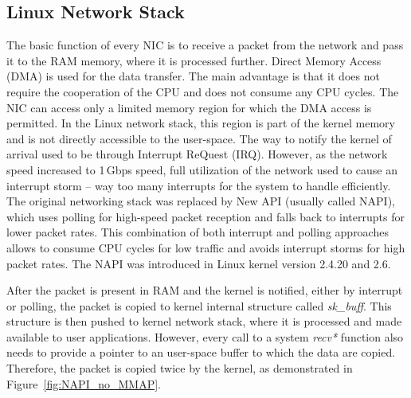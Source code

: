 \subsection{Linux Network Stack}

The basic function of every NIC is to receive a packet from the network and pass it to the RAM memory, where it is processed further. Direct Memory Access (DMA) is used for the data transfer. The main advantage is that it does not require the cooperation of the CPU and does not consume any CPU cycles. The NIC can access only a limited memory region for which the DMA access is permitted. In the Linux network stack, this region is part of the kernel memory and is not directly accessible to the user-space. The way to notify the kernel of arrival used to be through Interrupt ReQuest (IRQ). However, as the network speed increased to 1\,Gbps speed, full utilization of the network used to cause an interrupt storm -- way too many interrupts for the system to handle efficiently. The original networking stack was replaced by New API (usually called NAPI), which uses polling for high-speed packet reception and falls back to interrupts for lower packet rates. This combination of both interrupt and polling approaches allows to consume CPU cycles for low traffic and avoids interrupt storms for high packet rates. The NAPI was introduced in Linux kernel version 2.4.20 and 2.6.

After the packet is present in RAM and the kernel is notified, either by interrupt or polling, the packet is copied to kernel internal structure called \emph{sk\_buff}. This structure is then pushed to kernel network stack, where it is processed and made available to user applications. However, every call to a system \emph{recv*} function also needs to provide a pointer to an user-space buffer to which the data are copied. Therefore, the packet is copied twice by the kernel, as demonstrated in Figure~\ref{fig:NAPI_no_MMAP}.

